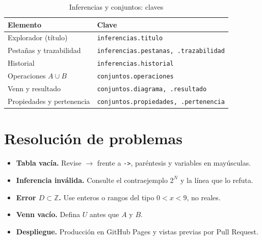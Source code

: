 \documentclass[11pt,a4paper,openany]{book}
\begin{document}
\begin{table}[H]
\centering
\caption{Inferencias y conjuntos: claves}
\begin{tabular}{ll}
\toprule
Elemento & Clave \\
\midrule
Explorador (t\'itulo) & \texttt{inferencias.titulo} \\
Pesta\~nas y trazabilidad & \texttt{inferencias.pestanas, .trazabilidad} \\
Historial & \texttt{inferencias.historial} \\
Operaciones $A \cup B$ & \texttt{conjuntos.operaciones} \\
Venn y resultado & \texttt{conjuntos.diagrama, .resultado} \\
Propiedades y pertenencia & \texttt{conjuntos.propiedades, .pertenencia} \\
\bottomrule
\end{tabular}
\end{table}

\chapter{Resoluci\'on de problemas}
\label{ch:faq}
\begin{itemize}[leftmargin=*]
\item \textbf{Tabla vac\'ia.} Revise $\to$ frente a \texttt{->}, par\'entesis y variables en may\'usculas.
\item \textbf{Inferencia inv\'alida.} Consulte el contraejemplo $2^{N}$ y la l\'inea que lo refuta.
\item \textbf{Error $D \subset \mathbb{Z}$.} Use enteros o rangos del tipo $0 < x < 9$, no reales.
\item \textbf{Venn vac\'io.} Defina $U$ antes que $A$ y $B$.
\item \textbf{Despliegue.} Producci\'on en GitHub Pages y vistas previas por Pull Request.
\end{itemize}
\end{document}
